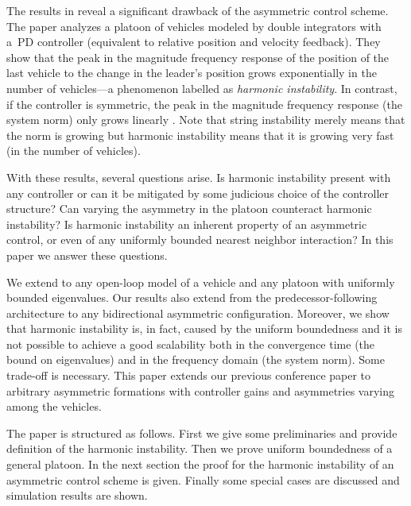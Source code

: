 \documentclass[technote, 10pt, twoside]{IEEEtran}
\theoremstyle{plain}
\theoremstyle{definition}
\theoremstyle{assump}
\begin{document}
The results in \cite{Tangerman2012} reveal a significant drawback of the
asymmetric control scheme. The paper analyzes a platoon of vehicles modeled by
double integrators with a~PD controller (equivalent to relative position and
velocity feedback). They show that the peak in the magnitude frequency response
of the position of the last vehicle to the change in the leader's position grows
exponentially in the number of vehicles---a phenomenon labelled as
\textit{harmonic instability}. In contrast, if the controller is symmetric, the
peak in the magnitude frequency response (the  system norm)
only grows linearly \cite{Veerman2007}. 
Note that string instability merely means that the
 norm is growing but harmonic instability means that it is
growing very fast (in the number of vehicles).

With these results, several questions arise. Is harmonic instability present
with any controller or can it be mitigated by some judicious choice of the
controller structure? Can varying the asymmetry in the platoon counteract
harmonic instability? Is harmonic instability an inherent property of an
asymmetric control, or even of any uniformly bounded nearest neighbor
interaction? In this paper we answer these questions.

We extend \cite{Tangerman2012} to any open-loop model of a vehicle and any
platoon with uniformly bounded eigenvalues. Our results also extend
\cite{Seiler2004a} from the predecessor-following architecture to any
bidirectional asymmetric configuration. Moreover, we show that harmonic
instability is, in fact, caused by the uniform boundedness and it is not
possible to achieve a good scalability both in the convergence time (the bound
on eigenvalues) and in the frequency domain (the  system
norm). Some trade-off is necessary. This paper extends our previous conference
paper \cite{Herman2014} to arbitrary asymmetric formations with controller gains
and asymmetries varying among the vehicles.

The paper is structured as follows. First we give some preliminaries and provide definition of the harmonic instability. Then we prove uniform boundedness of a general
platoon. In the next section the proof for the harmonic instability of an asymmetric control scheme is given. Finally some special cases are discussed and simulation results are shown.
\end{document}
